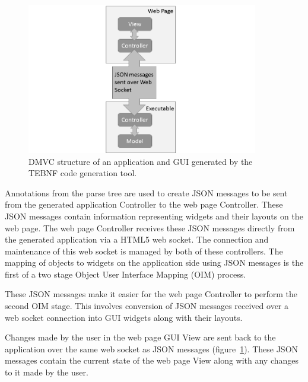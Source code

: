 \begin{figure}[h!]
\centering
\includegraphics[width=0.9\textwidth]{figures/DmvcStructure.png}
\caption{DMVC structure of an application and GUI generated by the TEBNF code generation tool.}
\label{fig:DmvcStructure}
\end{figure}

\indent
Annotations from the parse tree are used to create JSON messages to be sent from the generated application Controller to the web page Controller.  These JSON messages contain information representing widgets and their layouts on the web page.  The web page Controller receives these JSON messages directly from the generated application via a HTML5 web socket.  The connection and maintenance of this web socket is managed by both of these controllers.  The mapping of objects to widgets on the application side using JSON messages is the first of a two stage Object User Interface Mapping (OIM) process.

\indent
These JSON messages make it easier for the web page Controller to perform the second OIM stage.  This involves conversion of JSON messages received over a web socket connection into GUI widgets along with their layouts.

\indent
Changes made by the user in the web page GUI View are sent back to the application over the same web socket as JSON messages (figure~\ref{fig:DmvcStructure}).  These JSON messages contain the current state of the web page View along with any changes to it made by the user.
